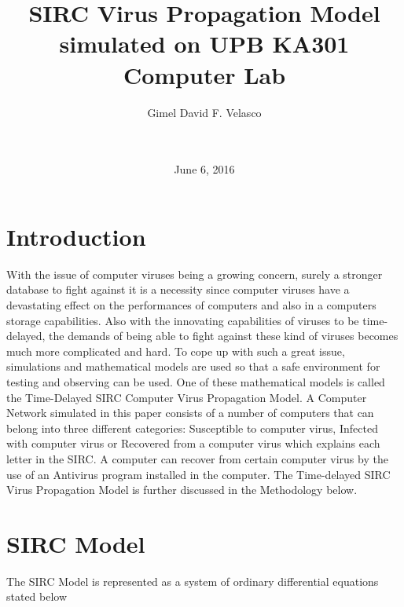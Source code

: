 \documentclass{acm_proc_article-sp}
\begin{document}
\title{SIRC Virus Propagation Model simulated on UPB KA301 Computer Lab}

\author{
\alignauthor
    Gimel David F. Velasco\\
    \\
    \\
}


\date{June 6, 2016}

\maketitle


\section{Introduction}
With the issue of computer viruses being a growing concern, surely a stronger database to fight against it is a necessity since computer viruses have a devastating effect on the performances of computers and also in a computers storage capabilities. Also with the innovating capabilities of viruses to be time-delayed, the demands of being able to fight against these kind of viruses becomes much more complicated and hard. To cope up with such a great issue, simulations and mathematical models are used so that a safe environment for testing and observing can be used. One of these mathematical models is called the Time-Delayed SIRC Computer Virus Propagation Model. A Computer Network simulated in this paper consists of a number of computers that can belong into three different categories: Susceptible to computer virus, Infected with computer virus or Recovered from a computer virus which explains each letter in the SIRC. A computer can recover from  certain computer virus by the use of an Antivirus program installed in the computer. The Time-delayed SIRC Virus Propagation Model is further discussed in the Methodology below.

\section{SIRC Model}
The SIRC Model is represented as a system of ordinary differential equations stated below
\end{document}
